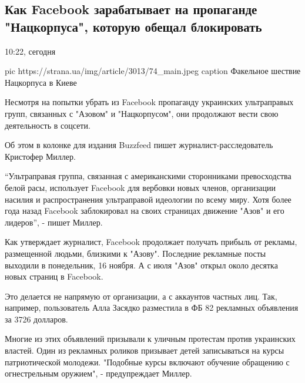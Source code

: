  
 
 

\subsection{Как Facebook зарабатывает на пропаганде "Нацкорпуса", которую обещал блокировать}

10:22, сегодня 

\ifcmt
pic https://strana.ua/img/article/3013/74_main.jpeg
caption Факельное шествие Нацкорпуса в Киеве
\fi

Несмотря на попытки убрать из Facebook пропаганду украинских ультраправых
групп, связанных с "Азовом" и "Нацкорпусом", они продолжают вести свою
деятельность в соцсети. 

Об этом в колонке для издания Buzzfeed пишет журналист-расследователь Кристофер
Миллер. 

\enquote{Ультраправая группа, связанная с американскими сторонниками превосходства
белой расы, использует Facebook для вербовки новых членов, организации насилия
и распространения ультраправой идеологии по всему миру. Хотя более года назад
Facebook заблокировал на своих страницах движение "Азов" и его лидеров}, -
пишет Миллер.

Как утверждает журналист, Facebook продолжает получать прибыль от рекламы,
размещенной людьми, близкими к "Азову". Последние рекламные посты выходили в
понедельник, 16 ноября. А с июля "Азов" открыл около десятка новых страниц в
Facebook.

Это делается не напрямую от организации, а с аккаунтов частных лиц. Так,
например, пользователь Алла Засядко разместила в ФБ 82 рекламных объявления за
3726 долларов.

Многие из этих объявлений призывали к уличным протестам против украинских
властей. Один из рекламных роликов призывает детей записываться на курсы
патриотической молодежи. "Подобные курсы включают обучение обращению с
огнестрельным оружием", - предупреждает Миллер.

